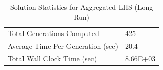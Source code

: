 \begin{table}[!htbp]
  \centering
  \begin{tabular}{|l|l|}
    \hline
	  Total Generations Computed & 425\\
    Average Time Per Generation (sec) & 20.4\\
    Total Wall Clock Time (sec)	 & 8.66E+03\\
    \hline
  \end{tabular}
\caption{Solution Statistics for Aggregated LHS (Long Run)}
  \label{tab:stat_agg_long}
\end{table} 

